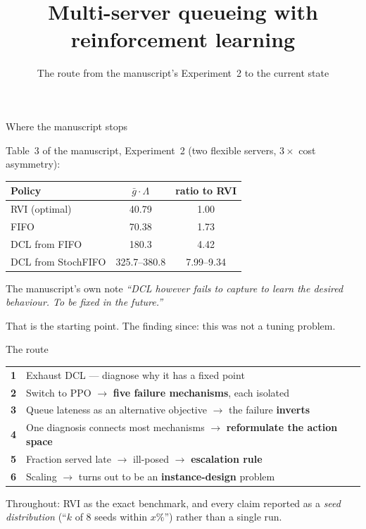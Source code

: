 \documentclass[11pt,aspectratio=169]{beamer}
\title[Queueing with RL: the route]{Multi-server queueing with reinforcement learning}
\subtitle{The route from the manuscript's Experiment~2 to the current state}
\author{}
\date{}
\newcommand{\good}[1]{\textbf{#1}}
\begin{document}
\begin{frame}
\titlepage
\end{frame}

\begin{frame}{Where the manuscript stops}

Table~3 of the manuscript, Experiment~2 (two flexible servers, $3\times$ cost
asymmetry):

\begin{center}
\begin{tabular}{lcc}
\toprule
Policy & $\bar g \cdot \Lambda$ & ratio to RVI \\
\midrule
RVI (optimal)      & 40.79  & 1.00 \\
FIFO               & 70.38  & 1.73 \\
\midrule
DCL from FIFO      & 180.3  & 4.42 \\
DCL from StochFIFO & 325.7--380.8 & 7.99--9.34 \\
\bottomrule
\end{tabular}
\end{center}

\vfill
\begin{block}{The manuscript's own note}
\emph{``DCL however fails to capture to learn the desired behaviour.
To be fixed in the future.''}
\end{block}

\vfill
That is the starting point.  The finding since: this was not a tuning problem.

\end{frame}

\begin{frame}{The route}

\begin{center}
\begin{tabular}{cp{9.2cm}}
\toprule
\textbf{1} & Exhaust DCL --- diagnose why it has a fixed point \\[2pt]
\textbf{2} & Switch to PPO $\to$ \good{five failure mechanisms}, each isolated \\[2pt]
\textbf{3} & Queue lateness as an alternative objective $\to$ the failure \good{inverts} \\[2pt]
\textbf{4} & One diagnosis connects most mechanisms $\to$ \good{reformulate the action space} \\[2pt]
\textbf{5} & Fraction served late $\to$ ill-posed $\to$ \good{escalation rule} \\[2pt]
\textbf{6} & Scaling $\to$ turns out to be an \good{instance-design} problem \\
\bottomrule
\end{tabular}
\end{center}

\vfill
Throughout: RVI as the exact benchmark, and every claim reported as a
\emph{seed distribution} (``$k$ of 8 seeds within $x\%$'') rather than a
single run.

\end{frame}
\end{document}
